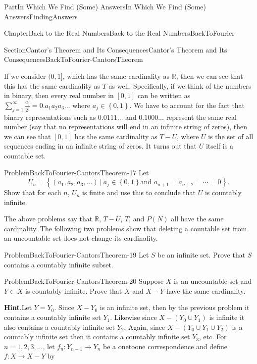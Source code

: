 \documentclass[oneside,10pt,]{book}
\newcommand{\blocktitlefont}{\relax}
\numberwithin{equation}{part}
\newcommand{\RR}{\mathbb {R}}
\begin{document}
\begin{partptx}{Part}{In Which We Find (Some) Answers}{}{In Which We Find (Some) Answers}{}{}{FindingAnswers}
\begin{chapterptx}{Chapter}{Back to the Real Numbers}{}{Back to the Real Numbers}{}{}{BackToFourier}
\begin{sectionptx}{Section}{Cantor's Theorem and Its Consequences}{}{Cantor's Theorem and Its Consequences}{}{}{BackToFourier-CantorsTheorem}
\par
If we consider \((0,1]\), which has the same cardinality as \(\RR\), then we can see that this has the same cardinality as \(T\) as well.  Specifically, if we think of the numbers in binary, then every real number in \([0,1]\) can be written as \(\displaystyle\sum_{j=1}^\infty \frac{a_j}{2^j} =0.a_1a_2a_3\ldots\) where \(a_j\in\left\{0,1\right\}\).  We have to account for the fact that binary representations such as \(0.0111\ldots\) and \(0.1000\ldots\) represent the same real number (say that no representations will end in an infinite string of zeros), then we can see that \([0,1]\) has the same cardinality as \(T-U\), where \(U\) is the set of all sequences ending in an infinite string of zeros.  It turns out that \(U\) itself is a countable set.%
\begin{problem}{Problem}{}{BackToFourier-CantorsTheorem-17}%
 Let%
\begin{equation*}
U_n=\left\{(a_1,a_2,a_3,\ldots)\ |\ a_j\in \left\{0,1\right\} \text{
and } a_{n+1}=a_{n+2}=\cdots=0\right\}\text{.}
\end{equation*}
Show that for each \(n\), \(U_n\) is finite and use this to conclude that \(U\) is countably infinite.%
\end{problem}
The above problems say that \(\RR\), \(T-U\), \(T\), and \(P(N)\) all have the same cardinality.  The following two problems show that deleting a countable set from an uncountable set does not change its cardinality.%
\begin{problem}{Problem}{}{BackToFourier-CantorsTheorem-19}%
 Let \(S\) be an infinite set.  Prove that \(S\) contains a countably infinite subset.%
\end{problem}
\begin{problem}{Problem}{}{BackToFourier-CantorsTheorem-20}%
Suppose \(X\) is an uncountable set and \(Y\subset X\) is countably infinite.         Prove that \(X\) and \(X-Y\) have the same cardinality.%
\par\smallskip%
\noindent\textbf{\blocktitlefont Hint}.\hypertarget{BackToFourier-CantorsTheorem-20-3}{}\quad{}Let \(Y=Y_0\).  Since \(X-Y_0\) is an infinite set, then by the previous problem it contains a countably infinite set \(Y_1\).  Likewise since \(X-(Y_0\cup
Y_1)\) is infinite it also contains a countably infinite set \(Y_2\).  Again, since \(X-(Y_0\cup Y_1\cup Y_2)\) is a countably infinite set then it contains a countably infinite set \(Y_3\), etc.  For \(n=1, 2, 3,\ldots \), let \(f_n:Y_{n-1}\rightarrow Y_n\) be a one\textendash{}to\textendash{}one correspondence and define \(f:X\rightarrow X-Y\) by%

\end{problem}
\end{sectionptx}
\end{chapterptx}
\end{partptx}
\end{document}
